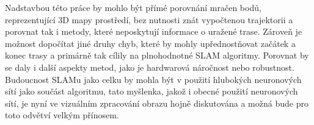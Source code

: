 \documentclass[12pt,a4paper]{report}
\begin{document}
Nadstavbou této práce by mohlo být přímé porovnání mračen bodů, reprezentující 3D mapy prostředí, bez nutnosti znát vypočtenou trajektorii a porovnat tak i metody, které neposkytují informace o uražené trase. Zároveň je možnost dopočítat jiné druhy chyb, které by mohly upřednostňovat začátek a konec trasy a primárně tak cílily na plnohodnotné SLAM algoritmy. Porovnat by se daly i další aspekty metod, jako je hardwarová náročnost nebo robustnost. Budoucnost SLAMu jako celku by mohla být v použití hlubokých neuronových sítí jako součást algoritmu, tato myšlenka, jakož i obecné použití neuronových sítí, je nyní ve vizuálním zpracování obrazu hojně diskutována a možná bude pro toto odvětví velkým přínosem.


\newpage

\end{document}

